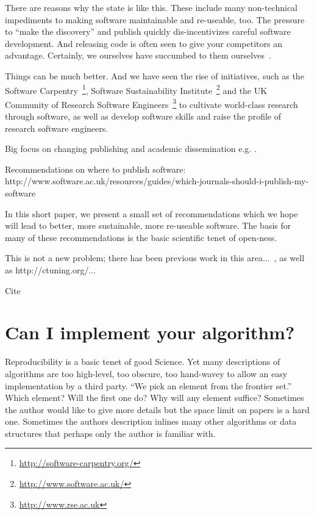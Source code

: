 \documentclass[conference]{IEEEtran}
\begin{document}
There are reasons why the state is like this. These include many
non-technical impediments to making software maintainable and
re-useable, too. The pressure to ``make the discovery'' and publish
quickly dis-incentivizes careful software development. And releasing
code is often seen to give your competitors an advantage. 
Certainly, we ourselves have succumbed to them
ourselves~\cite{crick-et-al:2009, SLAyer2011}.


Things can be much better. And we have seen the rise of initiatives,
such as the Software
Carpentry~\footnote{\url{http://software-carpentry.org/}}, Software
Sustainability Institute~\footnote{\url{http://www.software.ac.uk/}}
and the UK Community of Research Software
Engineers~\footnote{\url{http://www.rse.ac.uk}} to cultivate
world-class research through software, as well as develop software
skills and raise the profile of research software engineers.



Big focus on changing publishing and academic dissemination
e.g. \cite{stodden-et-al:2013,fursin+dubach:2014}.

Recommendations on where to publish software:
http://www.software.ac.uk/resources/guides/which-journals-should-i-publish-my-software


In this short paper, we present a small set of recommendations which
we hope will lead to better, more sustainable, more re-useable
software. The basis for many of these recommendations is the basic
scientific tenet of open-ness.

This is not a new problem; there has been previous work in this
area...~\cite{sim-et-al:2003,chirigati-et-al:2013}, as well as http://ctuning.org/...

Cite~\cite{collberg-et-al:2014}


\section{Can I implement your algorithm?}


Reproducibility is a basic tenet of good Science. Yet many
descriptions of algorithms are too high-level, too obscure, too
hand-wavey to allow an easy implementation by a third party. ``We pick
an element from the frontier set.'' Which element? Will the first one
do? Why will any element suffice? Sometimes the author would like to
give more details but the space limit on papers is a hard
one. Sometimes the authors description inlines many other algorithms
or data structures that perhaps only the author is familiar with.
\end{document}
